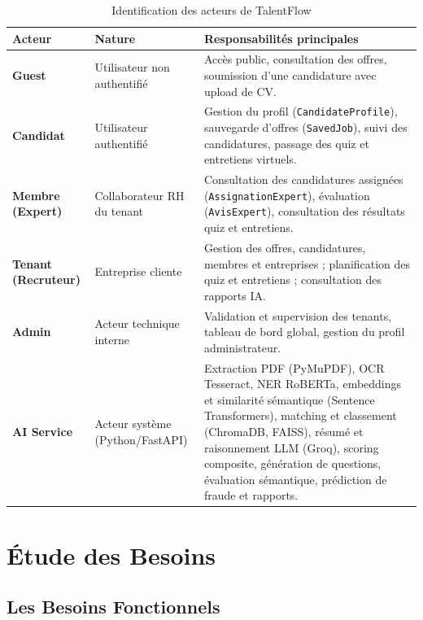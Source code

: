 \begin{table}[h]
\centering
\renewcommand{\arraystretch}{1.6}
\begin{tabular}{|p{3cm}|p{3.5cm}|p{6.5cm}|}
\hline
\textbf{Acteur} & \textbf{Nature} & \textbf{Responsabilités principales} \\
\hline
\textbf{Guest} & Utilisateur non authentifié & Accès public, consultation des offres, soumission d'une candidature avec upload de CV. \\
\hline
\textbf{Candidat} & Utilisateur authentifié & Gestion du profil (\texttt{CandidateProfile}), sauvegarde d'offres (\texttt{SavedJob}), suivi des candidatures, passage des quiz et entretiens virtuels. \\
\hline
\textbf{Membre (Expert)} & Collaborateur RH du tenant & Consultation des candidatures assignées (\texttt{AssignationExpert}), évaluation (\texttt{AvisExpert}), consultation des résultats quiz et entretiens. \\
\hline
\textbf{Tenant (Recruteur)} & Entreprise cliente & Gestion des offres, candidatures, membres et entreprises ; planification des quiz et entretiens ; consultation des rapports IA. \\
\hline
\textbf{Admin} & Acteur technique interne & Validation et supervision des tenants, tableau de bord global, gestion du profil administrateur. \\
\hline
\textbf{AI Service} & Acteur système (Python/FastAPI) & Extraction PDF (PyMuPDF), OCR Tesseract, NER RoBERTa, embeddings et similarité sémantique (Sentence Transformers), matching et classement (ChromaDB, FAISS), résumé et raisonnement LLM (Groq), scoring composite, génération de questions, évaluation sémantique, prédiction de fraude et rapports. \\
\hline
\end{tabular}
\caption{Identification des acteurs de TalentFlow}
\label{tab:acteurs}
\end{table}

\section{Étude des Besoins}

\subsection{Les Besoins Fonctionnels}

